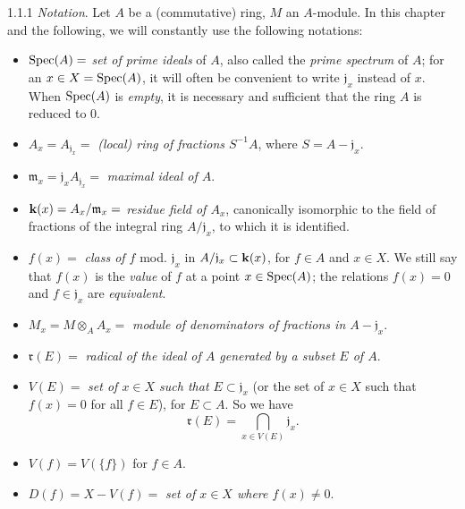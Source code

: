 \documentclass[../main.tex]{subfiles}
\begin{document}
\begin{env}{1.1.1}
\emph{Notation}. Let $A$ be a (commutative) ring, $M$ an $A$-module. In
this chapter and the following, we will constantly use the following notations:
\begin{itemize}
  \item[] $\operatorname{Spec}(A)=$ \emph{set of prime ideals} of $A$, also called the
          \emph{prime spectrum} of $A$; for an $x\in X=\operatorname{Spec}(A)$, it will often be
          convenient to write $\mathfrak{j}_x$ instead of $x$. When $\operatorname{Spec}(A)$ is
          \emph{empty}, it is necessary and sufficient that the ring $A$ is
          reduced to $0$.
  \item[] $A_x=A_{\mathfrak{j}_x}=$ \emph{(local) ring of fractions $S^{-1}A$},
          where $S=A-\mathfrak{j}_x$.
  \item[] $\mathfrak{m}_x=\mathfrak{j}_x A_{\mathfrak{j}_x}=$ \emph{maximal ideal of $A$}.
  \item[] $\mathbf{k}(x)=A_x/\mathfrak{m}_x=$ \emph{residue field of $A_x$},
          canonically isomorphic to the field of fractions
          of the integral ring $A/\mathfrak{j}_x$, to which it is identified.
  \item[] $f(x)=$ \emph{class of $f$} mod. $\mathfrak{j}_x$ in $A/\mathfrak{j}_x\subset\mathbf{k}(x)$,
          for $f\in A$ and $x\in X$. We still say that $f(x)$ is the \emph{value}
          of $f$ at a point $x\in\operatorname{Spec}(A)$; the relations $f(x)=0$ and $f\in\mathfrak{j}_x$ are
          \emph{equivalent}.
  \item[] $M_x=M\otimes_A A_x=$ \emph{module of denominators of fractions in $A-\mathfrak{j}_x$}.
  \item[] $\mathfrak{r}(E)=$ \emph{radical of the ideal of $A$ generated by a subset $E$ of $A$}.
  \item[] $V(E)=$ \emph{set of $x\in X$ such that $E\subset\mathfrak{j}_x$} (or the set of $x\in X$
          such that $f(x)=0$ for all $f\in E$), for $E\subset A$. So we have
          \[
            \mathfrak{r}(E)=\bigcap_{x\in V(E)}\mathfrak{j}_x.\tag{1.1.1.1}
          \]
  \item[] $V(f)=V(\{f\})$ for $f\in A$.
  \item[] $D(f)=X-V(f)=$ \emph{set of $x\in X$ where $f(x)\neq 0$}.
\end{itemize}
\end{env}
\end{document}
